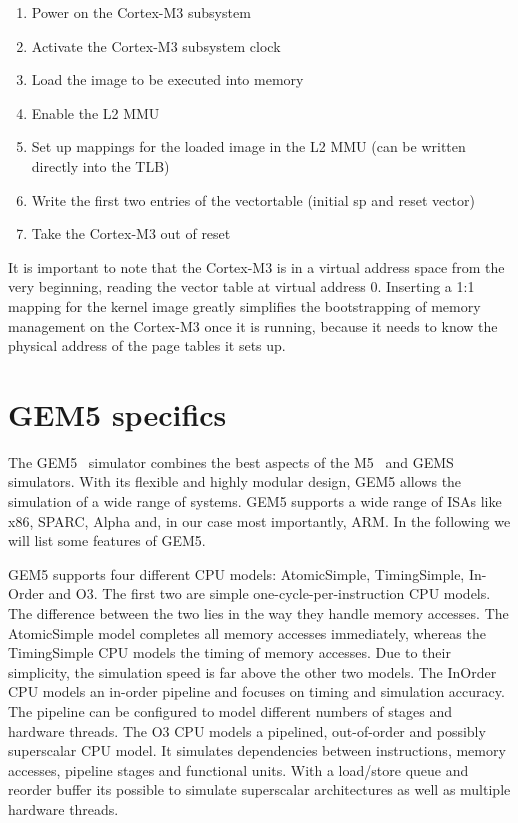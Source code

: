 \documentclass[a4paper,twoside]{report} %
\begin{document}
\begin{enumerate}
\item Power on the Cortex-M3 subsystem
\item Activate the Cortex-M3 subsystem clock
\item Load the image to be executed into memory
\item Enable the L2 MMU
\item Set up mappings for the loaded image in the L2 MMU (can be
  written directly into the TLB)
\item Write the first two entries of the vectortable (initial sp and
  reset vector)
\item Take the Cortex-M3 out of reset
\end{enumerate}

It is important to note that the Cortex-M3 is in a virtual address
space from the very beginning, reading the vector table at virtual
address 0. Inserting a 1:1 mapping for the kernel image greatly
simplifies the bootstrapping of memory management on the Cortex-M3
once it is running, because it needs to know the physical address of
the page tables it sets up.

\chapter{GEM5 specifics}

The GEM5~\cite{gem5:sigarch11} simulator combines the best aspects of
the M5~\cite{m5:micro06} and GEMS~\cite{gems:sigarch05}
simulators. With its flexible and highly modular design, GEM5 allows
the simulation of a wide range of systems. GEM5 supports a wide range
of ISAs like x86, SPARC, Alpha and, in our case most importantly,
ARM. In the following we will list some features of GEM5.

GEM5 supports four different CPU models: AtomicSimple, TimingSimple,
In-Order and O3. The first two are simple one-cycle-per-instruction
CPU models. The difference between the two lies in the way they handle
memory accesses. The AtomicSimple model completes all memory accesses
immediately, whereas the TimingSimple CPU models the timing of memory
accesses. Due to their simplicity, the simulation speed is far above
the other two models.  The InOrder CPU models an in-order pipeline and
focuses on timing and simulation accuracy. The pipeline can be
configured to model different numbers of stages and hardware threads.
The O3 CPU models a pipelined, out-of-order and possibly superscalar
CPU model. It simulates dependencies between instructions, memory
accesses, pipeline stages and functional units. With a load/store
queue and reorder buffer its possible to simulate superscalar
architectures as well as multiple hardware threads.
\end{document}
